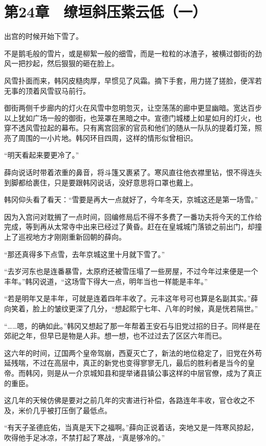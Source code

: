 \section{第24章　缭垣斜压紫云低（一）}

出宫的时候开始下雪了。

不是鹅毛般的雪片，或是柳絮一般的细雪，而是一粒粒的冰渣子，被横过御街的劲风一把抄起，然后狠狠的砸在脸上。

风雪扑面而来，韩冈皮糙肉厚，早惯见了风霜。摘下手套，用力搓了搓脸，便浑若无事的顶着风雪驭马前行。

御街两侧千步廊内的灯火在风雪中忽明忽灭，让空荡荡的廊中更显幽暗。宽达百步以上犹如广场一般的御街，也笼罩在黑暗之中。宣德门城楼上如星如月的灯火，也穿不透风雪拉起的幕布。只有离宫回家的官员和他们的随从一队队的提着灯笼，照亮了周围的一小片地。韩冈环目四周，这样的情形似曾相识。

“明天看起来要更冷了。”

薛向说话时带着浓重的鼻音，将斗篷又裹紧了。寒风直往他衣襟里钻，恨不得连头到脚都给裹住，只是要跟韩冈说话，没好意思将口罩也戴上。

韩冈仰头看了看天：“雪要是再大一点就好了，今年冬天，京城这还是第一场雪。”

因为入宫问对耽搁了一点时间，回编修局后不得不多费了一番功夫将今天的工作给完成，等到再从太常寺中出来已经过了黄昏。赶在在皇城城门落锁之前出门，却撞上了巡视地方才刚刚重新回朝的薛向。

“那还真得多下点雪，去年京城这里十月就下雪了。”

“去岁河东也是连番暴雪，太原府还被雪压塌了一些房屋，不过今年过来便是一个丰年。”韩冈说道，“这场雪下得大一点，明年当也一样能是丰年。”

“若是明年又是丰年，可就是连着四年丰收了。元丰这年号可也算是名副其实。”薛向笑着，脸上的皱纹更深了几分，“想起熙宁七年、八年的时候，真是恍若隔世。”

“……嗯，的确如此。”韩冈又想起了那一年帮着王安石与旧党过招的日子。同样是在郊祀之年，但早已是物是人非。想一想，也不过过去了区区六年而已。

这六年的时间，辽国两个皇帝驾崩，西夏灭亡了，新法的地位稳定了，旧党在外苟延残喘，不过在高层中，真正的新党也变得寥寥无几，最后的胜利者是当今的皇帝。而韩冈，则是从一介京城知县和提举诸县镇公事这样的中层官僚，成为了真正的重臣。

这几年的天候仿佛是要对之前几年的灾害进行补偿，各路连年丰收，官仓收之不及，米价几乎被打压倒了最低点。

“有天子圣德庇佑，当真是天下之福啊。”薛向正说着话，突地又是一阵寒风掠起，吹得他手足冰凉，不禁打起了寒战，“真是够冷的。”

